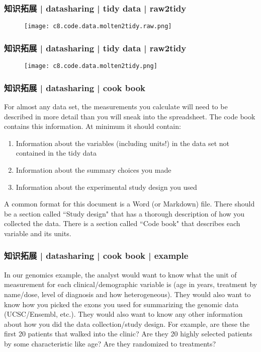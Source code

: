 \begin{frame}
  \frametitle{知识拓展 | datasharing | tidy data | raw2tidy}
  \begin{figure}
    \centering
    \texttt{[image: c8.code.data.molten2tidy.raw.png]}
  \end{figure}
\end{frame}

\begin{frame}
  \frametitle{知识拓展 | datasharing | tidy data | raw2tidy}
  \begin{figure}
    \centering
    \texttt{[image: c8.code.data.molten2tidy.png]}
  \end{figure}
\end{frame}

\begin{frame}
  \frametitle{知识拓展 | datasharing | cook book}
  For almost any data set, the measurements you calculate will need to be described in more detail than you will sneak into the spreadsheet.  The code book contains this information. At minimum it should contain:
  \begin{enumerate}
    \item Information about the variables (including units!) in the data set not contained in the tidy data
    \item Information about the summary choices you made
    \item Information about the experimental study design you used
  \end{enumerate}

  A common format for this document is a Word (or Markdown) file. There should be a section called ``Study design" that has a thorough description of how you collected the data. There is a section called ``Code book" that describes each variable and its units. 
\end{frame}

\begin{frame}
  \frametitle{知识拓展 | datasharing | cook book | example}
  In our genomics example, the analyst would want to know what the unit of measurement for each clinical/demographic variable is (age in years, treatment by name/dose, level of diagnosis and how heterogeneous). They would also want to know how you picked the exons you used for summarizing the genomic data (UCSC/Ensembl, etc.). They would also want to know any other information about how you did the data collection/study design. For example, are these the first 20 patients that walked into the clinic? Are they 20 highly selected patients by some characteristic like age? Are they randomized to treatments? 
\end{frame}

